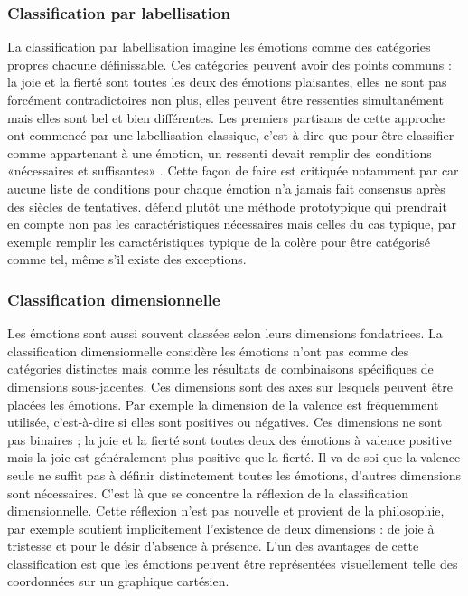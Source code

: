 \documentclass[a4paper,12pt]{report}
\begin{document}
		\subsubsection{Classification par labellisation}

La classification par labellisation imagine les émotions comme des catégories propres chacune définissable. Ces catégories peuvent avoir des points communs : la joie et la fierté sont toutes les deux des émotions plaisantes, elles ne sont pas forcément contradictoires non plus, elles peuvent être ressenties simultanément mais elles sont bel et bien différentes. Les premiers partisans de cette approche ont commencé par une labellisation classique, c'est-à-dire que pour être classifier comme appartenant à une émotion, un ressenti devait remplir des conditions «\;nécessaires et suffisantes\;» \parencite{clore88}. Cette façon de faire est critiquée notamment par \textcite{russell91} car aucune liste de conditions pour chaque émotion n'a jamais fait consensus après des siècles de tentatives. \textcite{russell91} défend plutôt une méthode prototypique qui prendrait en compte non pas les caractéristiques nécessaires mais celles du cas typique, par exemple remplir les caractéristiques typique de la colère pour être catégorisé comme tel, même s'il existe des exceptions. \par 


		\subsubsection{Classification dimensionnelle}	

Les émotions sont aussi souvent classées selon leurs dimensions fondatrices. La classification dimensionnelle considère les émotions n'ont pas comme des catégories distinctes mais comme les résultats de combinaisons spécifiques de dimensions sous-jacentes. Ces dimensions sont des axes sur lesquels peuvent être placées les émotions. Par exemple la dimension de la valence est fréquemment utilisée, c'est-à-dire si elles sont positives ou négatives. Ces dimensions ne sont pas binaires ; la joie et la fierté sont toutes deux des émotions à valence positive mais la joie est généralement plus positive que la fierté. Il va de soi que la valence seule ne suffit pas à définir distinctement toutes les émotions, d'autres dimensions sont nécessaires. C'est là que se concentre la réflexion de la classification dimensionnelle. Cette réflexion n'est pas nouvelle et provient de la philosophie, par exemple \textcite{spinoza1677} soutient implicitement l'existence de deux dimensions : de joie à tristesse et pour le désir d'absence à présence. L'un des avantages de cette classification est que les émotions peuvent être représentées visuellement telle des coordonnées sur un graphique cartésien. \par 
\end{document}
